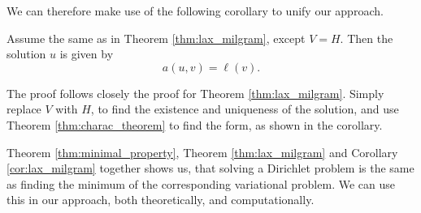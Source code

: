 We can therefore make use of the following corollary to unify our approach.
\begin{kor}{\quad}
   Assume the same as in Theorem \ref{thm:lax_milgram}, except $V=H$. Then 
   the solution $u$ is given by 
   \label{cor:lax_milgram}
   \begin{equation*}
    a(u,v) = \ell(v).
   \end{equation*}
   \vspace{-8mm}
\end{kor}
\begin{bev}
    The proof follows closely the proof for Theorem \ref{thm:lax_milgram}. 
    Simply replace $V$ with $H$, to find the existence and uniqueness of the 
    solution, and use Theorem \ref{thm:charac_theorem} to find the form, as 
    shown in the corollary.
\end{bev}
Theorem \ref{thm:minimal_property}, Theorem \ref{thm:lax_milgram} and Corollary 
\ref{cor:lax_milgram} together shows us, that solving a Dirichlet problem is 
the same as finding the minimum of the corresponding variational problem. 
We can use this in our approach, both theoretically, and computationally.